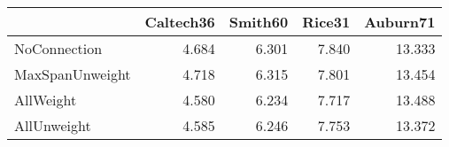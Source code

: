 \begin{tabular}{lrrrr}
\toprule
{} & Caltech36 & Smith60 & Rice31 & Auburn71 \\
\midrule
NoConnection    &     4.684 &   6.301 &  7.840 &   13.333 \\
MaxSpanUnweight &     4.718 &   6.315 &  7.801 &   13.454 \\
AllWeight       &     4.580 &   6.234 &  7.717 &   13.488 \\
AllUnweight     &     4.585 &   6.246 &  7.753 &   13.372 \\
\bottomrule
\end{tabular}
